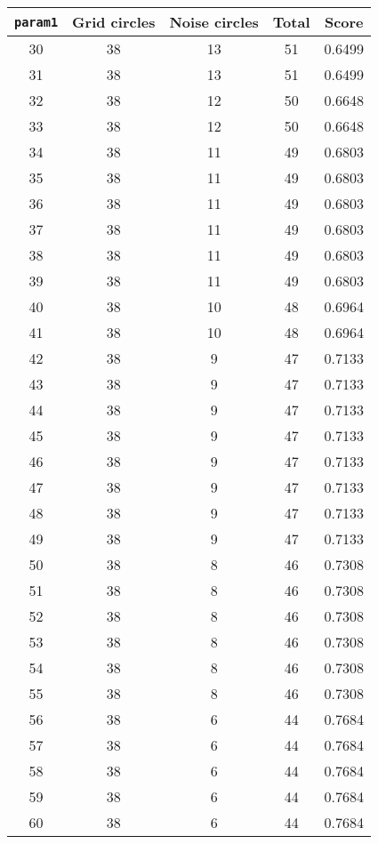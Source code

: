 \documentclass[letterpaper, 12pt]{article}
\begin{document}
\begin{longtable}{|c|c|c|c|c|}
\hline
\textbf{\texttt{param1}} & \textbf{Grid circles} & \textbf{Noise circles} & \textbf{Total} & \textbf{Score} \\
\hline
30 & 38 & 13 & 51 & 0.6499 \\
\hline
31 & 38 & 13 & 51 & 0.6499 \\
\hline
32 & 38 & 12 & 50 & 0.6648 \\
\hline
33 & 38 & 12 & 50 & 0.6648 \\
\hline
34 & 38 & 11 & 49 & 0.6803 \\
\hline
35 & 38 & 11 & 49 & 0.6803 \\
\hline
36 & 38 & 11 & 49 & 0.6803 \\
\hline
37 & 38 & 11 & 49 & 0.6803 \\
\hline
38 & 38 & 11 & 49 & 0.6803 \\
\hline
39 & 38 & 11 & 49 & 0.6803 \\
\hline
40 & 38 & 10 & 48 & 0.6964 \\
\hline
41 & 38 & 10 & 48 & 0.6964 \\
\hline
42 & 38 & 9 & 47 & 0.7133 \\
\hline
43 & 38 & 9 & 47 & 0.7133 \\
\hline
44 & 38 & 9 & 47 & 0.7133 \\
\hline
45 & 38 & 9 & 47 & 0.7133 \\
\hline
46 & 38 & 9 & 47 & 0.7133 \\
\hline
47 & 38 & 9 & 47 & 0.7133 \\
\hline
48 & 38 & 9 & 47 & 0.7133 \\
\hline
49 & 38 & 9 & 47 & 0.7133 \\
\hline
50 & 38 & 8 & 46 & 0.7308 \\
\hline
51 & 38 & 8 & 46 & 0.7308 \\
\hline
52 & 38 & 8 & 46 & 0.7308 \\
\hline
53 & 38 & 8 & 46 & 0.7308 \\
\hline
54 & 38 & 8 & 46 & 0.7308 \\
\hline
55 & 38 & 8 & 46 & 0.7308 \\
\hline
56 & 38 & 6 & 44 & 0.7684 \\
\hline
57 & 38 & 6 & 44 & 0.7684 \\
\hline
58 & 38 & 6 & 44 & 0.7684 \\
\hline
59 & 38 & 6 & 44 & 0.7684 \\
\hline
60 & 38 & 6 & 44 & 0.7684 \\
\hline

\end{longtable}
\end{document}
